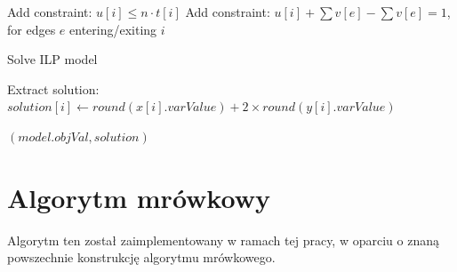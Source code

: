 \begin{algorithm}
\begin{algorithmic}[1]
             
                \State Add constraint: $u[i] \leq n \cdot t[i]$
                \State Add constraint: $u[i] + \sum v[e] - \sum v[e] = 1$, for edges $e$ entering/exiting $i$
            \EndFor
    
            \State Solve ILP model
    
            \State Extract solution:
                \State $solution[i] \gets round(x[i].varValue) + 2 \times round(y[i].varValue)$
            \EndFor
    
            \State \Return $(model.objVal, solution)$
        \EndFunction
    \end{algorithmic}
    \end{algorithm}

\FloatBarrier
\section{Algorytm mrówkowy}

Algorytm ten został zaimplementowany w ramach tej pracy, w oparciu o znaną powszechnie konstrukcję algorytmu mrówkowego.

